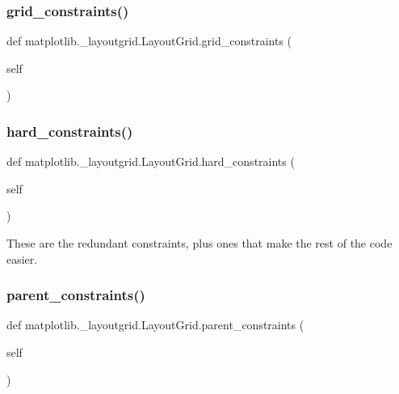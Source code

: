 \subsubsection{\texorpdfstring{grid\+\_\+constraints()}{grid\_constraints()}}
{\footnotesize\ttfamily def matplotlib.\+\_\+layoutgrid.\+Layout\+Grid.\+grid\+\_\+constraints (\begin{DoxyParamCaption}\item[{}]{self }\end{DoxyParamCaption})}

\mbox{\label{classmatplotlib_1_1__layoutgrid_1_1LayoutGrid_a202b7a7e498b7001f4bcc2357ceeace6}} 
\subsubsection{\texorpdfstring{hard\+\_\+constraints()}{hard\_constraints()}}
{\footnotesize\ttfamily def matplotlib.\+\_\+layoutgrid.\+Layout\+Grid.\+hard\+\_\+constraints (\begin{DoxyParamCaption}\item[{}]{self }\end{DoxyParamCaption})}

\begin{DoxyVerb}These are the redundant constraints, plus ones that make the
rest of the code easier.
\end{DoxyVerb}
 \mbox{\label{classmatplotlib_1_1__layoutgrid_1_1LayoutGrid_afce8330628746415d6394b1cc510e4b4}} 
\subsubsection{\texorpdfstring{parent\+\_\+constraints()}{parent\_constraints()}}
{\footnotesize\ttfamily def matplotlib.\+\_\+layoutgrid.\+Layout\+Grid.\+parent\+\_\+constraints (\begin{DoxyParamCaption}\item[{}]{self }\end{DoxyParamCaption})}

